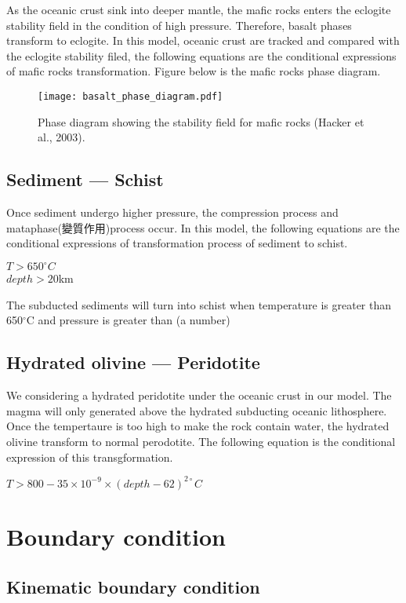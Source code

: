 As the oceanic crust sink into deeper mantle, the mafic rocks enters the eclogite stability field in the condition of high pressure. 
Therefore, basalt phases transform to eclogite.  
In this model, oceanic crust are tracked and compared with the eclogite stability filed, the following equations are the conditional expressions of mafic rocks transformation. 
Figure below is the mafic rocks phase diagram.
\begin{figure*}[ht!]
    \centering
    \texttt{[image: basalt\_phase\_diagram.pdf]}
    \caption{ Phase diagram showing the stability field for mafic rocks (Hacker et al., 2003).  }
    \label{fig::elastic}
\end{figure*}

\subsection{Sediment --- Schist}

Once sediment undergo higher pressure, the compression process and mataphase(變質作用)process occur.
In this model, the following equations are the conditional expressions of transformation process of sediment to schist.

$T > 650^{\circ} C$\\
$depth >  20 $km 

The subducted sediments will turn into schist when temperature is greater than 650$^\circ$C and pressure is greater than (a number)

\subsection{Hydrated olivine --- Peridotite}

We considering a hydrated peridotite under the oceanic crust in our model. 
The magma will only generated above the hydrated subducting oceanic lithosphere.
Once the tempertaure is too high to make the rock contain water, the hydrated olivine transform to normal perodotite.
The following equation is the conditional expression of this transgformation.

$T > 800-35\times 10^{-9}\times (depth-62)^{2\circ}C$

\section{Boundary condition}

\subsection{Kinematic boundary condition}

